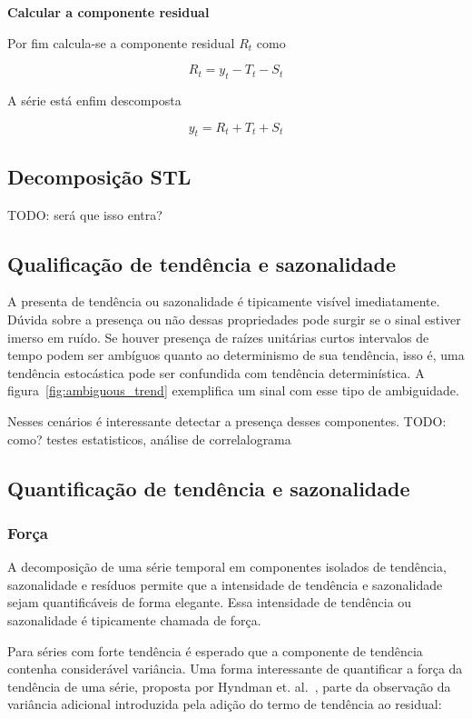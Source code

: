 \textbf{Calcular a componente residual}

Por fim calcula-se a componente residual $R_t$ como

$$ R_t = y_t - T_t - S_t $$

A série está enfim descomposta

$$ y_t = R_t + T_t + S_t $$

\subsection{Decomposição STL}

TODO: será que isso entra?

\subsection{Qualificação de tendência e sazonalidade}

A presenta de tendência ou sazonalidade é tipicamente visível imediatamente.
Dúvida sobre a presença ou não dessas propriedades pode surgir se o sinal
estiver imerso em ruído. Se houver presença de raízes unitárias curtos
intervalos de tempo podem ser ambíguos quanto ao determinismo de sua tendência,
isso é, uma tendência estocástica pode ser confundida com tendência
determinística. A figura~\ref{fig:ambiguous_trend} exemplifica um sinal com
esse tipo de ambiguidade.

Nesses cenários é interessante detectar a presença desses componentes.
TODO: como? testes estatisticos, análise de correlalograma

\subsection{Quantificação de tendência e sazonalidade}

\subsubsection{Força}

A decomposição de uma série temporal em componentes isolados de tendência,
sazonalidade e resíduos permite que a intensidade de tendência e sazonalidade
sejam quantificáveis de forma elegante. Essa intensidade de tendência ou
sazonalidade é tipicamente chamada de força.

Para séries com forte tendência é esperado que a componente de tendência
contenha considerável variância. Uma forma interessante de quantificar a força
da tendência de uma série, proposta por Hyndman et. al.~\cite{athana}, parte
da observação da variância adicional introduzida pela adição do termo de
tendência ao residual:

